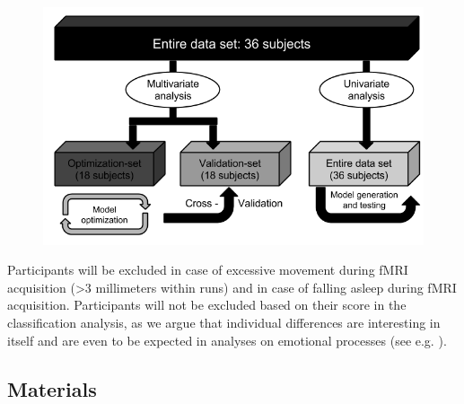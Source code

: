 \documentclass[12pt,a4paper]{article}\usepackage[]{graphicx}\usepackage[]{color}
\begin{document}
\begin{figure}[t]
\centering
\includegraphics[scale=.5]{ModelOptimization}
\end{figure}

Participants will be excluded in case of excessive movement during fMRI acquisition (\textgreater 3 millimeters within runs) and in case of falling asleep during fMRI acquisition. Participants will not be excluded based on their score in the classification analysis, as we argue that individual differences are interesting in itself and are even to be expected in analyses on emotional processes (see e.g. \citealp{oosterwijk2015}). 


\subsection{Materials}
\end{document}
